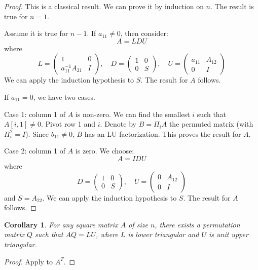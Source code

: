 \documentclass{article}
\newtheorem{corollary}{Corollary}[section]
\begin{document}
\begin{proof}
    This is a classical result. We can prove it by induction on $n$. The result is true for $n=1$.

    Assume it is true for $n-1$. If $a_{11} \neq 0$, then consider:
    \[
        A = LDU
    \]
    where
    \[
        L = \begin{pmatrix}
            1                  & 0 \\
            a_{11}^{-1} A_{21} & I
        \end{pmatrix}, \quad
        D = \begin{pmatrix}
            1 & 0 \\
            0 & S
        \end{pmatrix}, \quad
        U = \begin{pmatrix}
            a_{11} & A_{12} \\
            0      & I
        \end{pmatrix}
    \]
    We can apply the induction hypothesis to $S$. The result for $A$ follows.

    If $a_{11} = 0$, we have two cases.

    Case 1: column 1 of $A$ is non-zero. We can find the smallest $i$ such that $A[i,1] \neq 0$. Pivot row 1 and $i$. Denote by $B = \Pi_i A$ the permuted matrix (with $\Pi_i^2 = I$). Since $b_{11} \neq 0$, $B$ has an LU factorization. This proves the result for $A$.

    Case 2: column 1 of $A$ is zero. We choose:
    \[
        A = I D U
    \]
    where
    \[
        D = \begin{pmatrix}
            1 & 0 \\
            0 & S
        \end{pmatrix}, \quad
        U = \begin{pmatrix}
            0 & A_{12} \\
            0 & I
        \end{pmatrix}
    \]
    and $S=A_{22}$. We can apply the induction hypothesis to $S$. The result for $A$ follows.
\end{proof}

\begin{corollary}\label{cor:col_permutation}
    For any square matrix $A$ of size $n$, there exists a permutation matrix $Q$ such that $AQ = LU$, where $L$ is lower triangular and $U$ is unit upper triangular.
\end{corollary}

\begin{proof}
    Apply  to $A^T$.
\end{proof}
\end{document}
